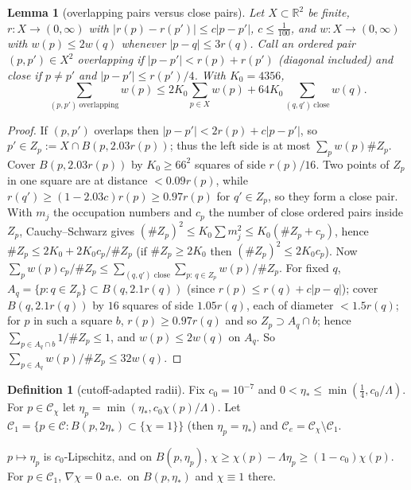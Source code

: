 \documentclass[11pt,reqno]{amsart}
\numberwithin{equation}{section}
\theoremstyle{plain}
\newtheorem{lemma}[theorem]{Lemma}
\theoremstyle{definition}
\newtheorem{definition}[theorem]{Definition}
\newcommand{\R}{\mathbb{R}}
\begin{document}
\begin{lemma}[overlapping pairs versus close pairs]\label{lem:cells}
Let $X\subset\R^2$ be finite, $r\colon X\to(0,\infty)$ with $|r(p)-r(p')|\le c|p-p'|$, $c\le\frac1{100}$, and $w\colon X\to(0,\infty)$ with $w(p)\le2w(q)$ whenever $|p-q|\le3r(q)$.  Call an ordered pair $(p,p')\in X^2$ \emph{overlapping} if $|p-p'|<r(p)+r(p')$ \textup{(}diagonal included\textup{)} and \emph{close} if $p\ne p'$ and $|p-p'|\le r(p')/4$.  With $K_0=4356$,
\[
\sum_{(p,p')\ \mathrm{overlapping}}w(p)\le2K_0\sum_{p\in X}w(p)+64K_0\sum_{(q,q')\ \mathrm{close}}w(q).
\]
\end{lemma}
\begin{proof}
If $(p,p')$ overlaps then $|p-p'|<2r(p)+c|p-p'|$, so $p'\in Z_p:=X\cap B(p,2.03r(p))$; thus the left side is at most $\sum_pw(p)\#Z_p$.  Cover $B(p,2.03r(p))$ by $K_0\ge66^2$ squares of side $r(p)/16$.  Two points of $Z_p$ in one square are at distance $<0.09r(p)$, while $r(q')\ge(1-2.03c)r(p)\ge0.97r(p)$ for $q'\in Z_p$, so they form a close pair.  With $m_j$ the occupation numbers and $c_p$ the number of close ordered pairs inside $Z_p$, Cauchy--Schwarz gives $(\#Z_p)^2\le K_0\sum m_j^2\le K_0(\#Z_p+c_p)$, hence $\#Z_p\le2K_0+2K_0c_p/\#Z_p$ (if $\#Z_p\ge2K_0$ then $(\#Z_p)^2\le2K_0c_p$).  Now $\sum_pw(p)c_p/\#Z_p\le\sum_{(q,q')\text{ close}}\sum_{p:\,q\in Z_p}w(p)/\#Z_p$.  For fixed $q$, $A_q=\{p:q\in Z_p\}\subset B(q,2.1r(q))$ (since $r(p)\le r(q)+c|p-q|$); cover $B(q,2.1r(q))$ by $16$ squares of side $1.05r(q)$, each of diameter $<1.5r(q)$; for $p$ in such a square $b$, $r(p)\ge0.97r(q)$ and so $Z_p\supset A_q\cap b$; hence $\sum_{p\in A_q\cap b}1/\#Z_p\le1$, and $w(p)\le2w(q)$ on $A_q$.  So $\sum_{p\in A_q}w(p)/\#Z_p\le32w(q)$.
\end{proof}

\begin{definition}[cutoff-adapted radii]\label{def:radii}
Fix $c_0=10^{-7}$ and $0<\eta_*\le\min(\frac14,c_0/\Lambda)$.  For $p\in\mathcal C_\chi$ let $\eta_p=\min(\eta_*,c_0\chi(p)/\Lambda)$.  Let $\mathcal C_1=\{p\in\mathcal C:B(p,2\eta_*)\subset\{\chi=1\}\}$ (then $\eta_p=\eta_*$) and $\mathcal C_e=\mathcal C_\chi\setminus\mathcal C_1$.
\end{definition}
$p\mapsto\eta_p$ is $c_0$-Lipschitz, and on $B(p,\eta_p)$, $\chi\ge\chi(p)-\Lambda\eta_p\ge(1-c_0)\chi(p)$.  For $p\in\mathcal C_1$, $\nabla\chi=0$ a.e.\ on $B(p,\eta_*)$ and $\chi\equiv1$ there.
\end{document}
